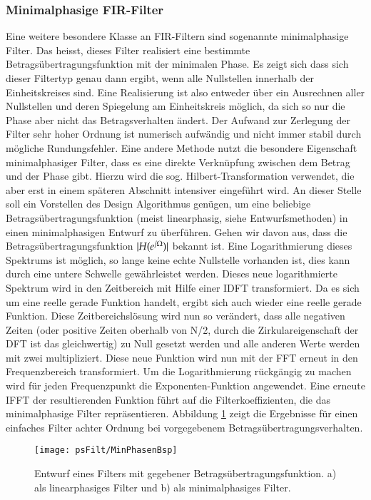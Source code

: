 \subsubsection{Minimalphasige FIR-Filter}
Eine weitere besondere Klasse an FIR-Filtern sind sogenannte minimalphasige Filter. Das heisst,
dieses Filter realisiert eine bestimmte Betragsübertragungsfunktion mit der minimalen Phase. Es zeigt
sich dass sich dieser Filtertyp genau dann ergibt, wenn alle Nullstellen innerhalb der Einheitskreises sind.
Eine Realisierung ist also entweder über ein Ausrechnen aller Nullstellen und deren Spiegelung
am Einheitskreis möglich, da sich so nur die Phase aber nicht das Betragsverhalten ändert. Der Aufwand zur
Zerlegung der Filter sehr hoher Ordnung ist numerisch aufwändig und nicht immer stabil durch
mögliche Rundungsfehler. Eine andere Methode nutzt die besondere Eigenschaft minimalphasiger Filter, dass es
eine direkte Verknüpfung zwischen dem Betrag und der Phase gibt. Hierzu wird die sog. Hilbert-Transformation
verwendet, die aber erst in einem späteren Abschnitt intensiver eingeführt wird. An dieser Stelle soll
ein Vorstellen des Design Algorithmus genügen, um eine beliebige Betragsübertragungsfunktion
(meist linearphasig, siehe Entwurfsmethoden) in einen minimalphasigen Entwurf zu überführen.
Gehen wir davon aus, dass die Betragsübertragungsfunktion $|H (e^{j\Omega})|$ bekannt ist. Eine
Logarithmierung dieses Spektrums ist möglich, so lange keine echte Nullstelle vorhanden ist, dies
kann durch eine untere Schwelle gewährleistet werden. Dieses neue logarithmierte Spektrum wird
in den Zeitbereich mit Hilfe einer IDFT transformiert. Da es sich um eine reelle gerade Funktion
handelt, ergibt sich auch wieder eine reelle gerade Funktion. Diese Zeitbereichslösung wird nun
so verändert, dass alle negativen Zeiten (oder positive Zeiten oberhalb von N/2, durch die Zirkulareigenschaft
der DFT ist das gleichwertig) zu Null gesetzt werden und alle anderen Werte werden mit zwei multipliziert.
Diese neue Funktion wird nun mit der FFT erneut in den Frequenzbereich transformiert.
Um die Logarithmierung rückgängig zu machen wird für jeden Frequenzpunkt die Exponenten-Funktion angewendet.
Eine erneute IFFT der resultierenden Funktion führt auf die Filterkoeffizienten, die das minimalphasige
Filter repräsentieren.
Abbildung \ref{pic:MinimalphasigDesign} zeigt die Ergebnisse für
einen einfaches Filter achter Ordnung bei vorgegebenem Betragsübertragungsverhalten.
\begin{figure}[H]
\begin{center}
\texttt{[image: psFilt/MinPhasenBsp]}
\caption{\label{pic:MinimalphasigDesign}Entwurf eines Filters mit gegebener Betragsübertragungsfunktion. a)
als linearphasiges Filter und b) als minimalphasiges Filter.}
\end{center}
\end{figure}


